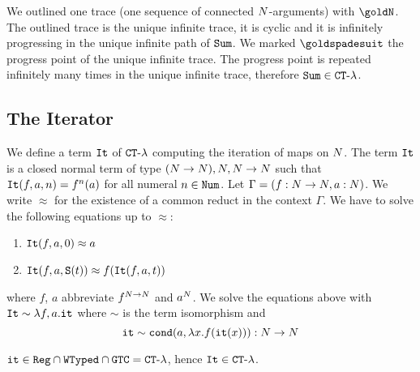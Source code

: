 We %
outlined one trace (one sequence of connected ${N}$-arguments)
with $\goldN$. The outlined trace is the unique 
infinite trace, it is cyclic and it is infinitely progressing in the unique infinite path
of ${\tt Sum}$.
We marked $\goldspadesuit$ the progress point of the unique infinite trace.
The progress point is repeated infinitely many times in the unique infinite trace,
therefore ${\tt Sum} \in { {\tt CT}\mbox{-}\lambda}$. 


%



\subsection{The Iterator}

\begin{Eg}
We define a term ${\tt It}$ of  ${ {\tt CT}\mbox{-}\lambda}$ computing the iteration of maps on ${N}$.
The term ${\tt It}$ is a closed normal term of type $({N} \rightarrow {N}), {N},{N} \rightarrow {N}$ such 
that ${\tt It}(f,a,n)=f^n(a)$ for all numeral $n \in {\tt Num}$. 
Let $\Gamma = (f:{N} \rightarrow {N}, a:{N})$. We write $\approx$ for
the existence of a common reduct in the context $\Gamma$. 
We have to solve the following equations up to $\approx$:

\begin{enumerate}
\item
${\tt It}(f,a,0) \approx a$ 
\item
${\tt It}(f,a,{\tt S} (t)) \approx f({\tt It}(f,a,t))$
\end{enumerate}

where $f$, $a$ abbreviate $f^{{N}\rightarrow{N}}$ and $a^{N}$.
We solve the equations above with ${\tt It} \sim \lambda f, a.{\tt it}$
where $\sim$ is the term isomorphism and
$$
{\tt it} \sim {\tt cond} (a, \lambda x.f({\tt it}(x))):{N} \rightarrow {N}
$$ 
\end{Eg}

\begin{proposition}
\label{proposition-iterator-in-CT-lambda}
${\tt it} \in {\tt Reg} \cap {\tt WTyped} \cap {\tt GTC} = { {\tt CT}\mbox{-}\lambda}$, 
hence ${\tt It} \in { {\tt CT}\mbox{-}\lambda}$.
\end{proposition}

